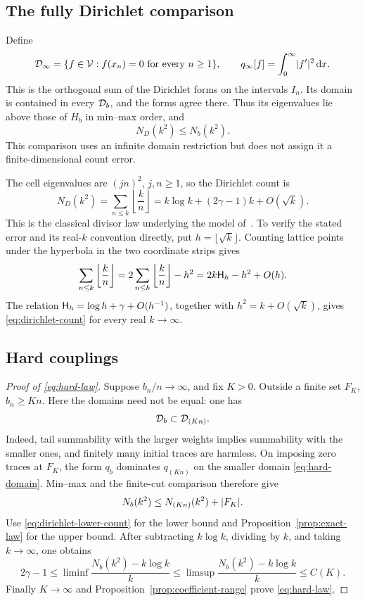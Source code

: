 \subsection{The fully Dirichlet comparison}

Define
\[
 \mathcal D_\infty=\{f\in\mathcal V:f(x_n)=0\text{ for every }n\ge1\},
 \qquad q_\infty[f]=\int_0^\infty\lvert f'\rvert^2\,\mathrm d x.
\]
This is the orthogonal sum of the Dirichlet forms on the
intervals $I_n$. Its domain is contained in every $\mathcal D_b$,
and the forms agree there. Thus its eigenvalues lie above
those of $H_b$ in min--max order, and
\begin{equation}
 N_D(k^2)\le N_b(k^2).
 \label{eq:dirichlet-lower-count}
\end{equation}
This comparison uses an infinite domain restriction but
does not assign it a finite-dimensional count error.

The cell eigenvalues are $(jn)^2$, $j,n\ge1$, so the
Dirichlet count is
\begin{equation}
 N_D(k^2)=\sum_{n\le k}\left\lfloor\frac{k}{n}\right\rfloor
            =k\log k+(2\gamma-1)k+O(\sqrt{k}).
 \label{eq:dirichlet-count}
\end{equation}
This is the classical divisor law underlying the model
of~\cite{egger2011trace}. To verify the stated error and
its real-$k$ convention directly, put
$h=\lfloor\sqrt{k}\rfloor$. Counting lattice points
under the hyperbola in the two coordinate strips gives
\[
 \sum_{n\le k}\left\lfloor\frac{k}{n}\right\rfloor
      =2\sum_{n\le h}\left\lfloor\frac{k}{n}\right\rfloor-h^2
      =2k\mathsf H_h-h^2+O(h).
\]
The relation $\mathsf H_h=\log h+\gamma+O(h^{-1})$, together
with $h^2=k+O(\sqrt{k})$, gives
\eqref{eq:dirichlet-count} for every real $k\to\infty$.

\subsection{Hard couplings}

\begin{proof}[Proof of \eqref{eq:hard-law}]
Suppose $b_n/n\to\infty$, and fix $K>0$.
Outside a finite set $F_K$, $b_n\ge Kn$.
Here the domains need not be equal: one has
\begin{equation}
 \mathcal D_b\subset\mathcal D_{(Kn)}.
 \label{eq:hard-domain}
\end{equation}
Indeed, tail summability with the larger weights implies
summability with the smaller ones, and finitely many
initial traces are harmless. On imposing zero traces at
$F_K$, the form $q_b$ dominates $q_{(Kn)}$ on the smaller
domain \eqref{eq:hard-domain}. Min--max and the finite-cut
comparison therefore give
\begin{equation}
 N_b(k^2)\le N_{(Kn)}(k^2)+\lvert F_K\rvert.
 \label{eq:hard-count-upper}
\end{equation}
Use \eqref{eq:dirichlet-lower-count} for the lower bound
and Proposition~\ref{prop:exact-law} for the upper bound.
After subtracting $k\log k$, dividing by $k$, and taking
$k\to\infty$, one obtains
\[
 2\gamma-1\le\liminf\frac{N_b(k^2)-k\log k}{k}
     \le\limsup\frac{N_b(k^2)-k\log k}{k}\le C(K).
\]
Finally $K\to\infty$ and
Proposition~\ref{prop:coefficient-range} prove
\eqref{eq:hard-law}.
\end{proof}

